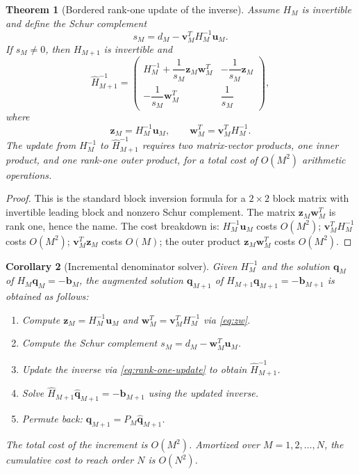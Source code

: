 \documentclass[11pt]{article}
\newtheorem{theorem}{Theorem}[section]
\newtheorem{corollary}[theorem]{Corollary}
\theoremstyle{definition}
\theoremstyle{remark}
\begin{document}
\begin{theorem}[Bordered rank-one update of the inverse]
\label{thm:rank-one}
Assume $H_{M}$ is invertible and define the Schur complement
\begin{equation}
s_{M}=d_{M}-\mathbf{v}_{M}^{T}H_{M}^{-1}\mathbf{u}_{M}.
\label{eq:schur}
\end{equation}
If $s_{M}\neq 0$, then $H_{M+1}$ is invertible and
\begin{equation}
\hat{H}_{M+1}^{-1}=
\begin{pmatrix}
H_{M}^{-1}+\dfrac{1}{s_{M}}\mathbf{z}_{M}\mathbf{w}_{M}^{T} & -\dfrac{1}{s_{M}}\mathbf{z}_{M}\\[8pt]
-\dfrac{1}{s_{M}}\mathbf{w}_{M}^{T} & \dfrac{1}{s_{M}}
\end{pmatrix},
\label{eq:rank-one-update}
\end{equation}
where
\begin{equation}
\mathbf{z}_{M}=H_{M}^{-1}\mathbf{u}_{M},\qquad
\mathbf{w}_{M}^{T}=\mathbf{v}_{M}^{T}H_{M}^{-1}.
\label{eq:zw}
\end{equation}
The update from $H_{M}^{-1}$ to $\hat{H}_{M+1}^{-1}$ requires two matrix-vector products, one inner product, and one rank-one outer product, for a total cost of $O(M^{2})$ arithmetic operations.
\end{theorem}

\begin{proof}
This is the standard block inversion formula for a $2\times 2$ block matrix with invertible leading block and nonzero Schur complement. The matrix $\mathbf{z}_{M}\mathbf{w}_{M}^{T}$ is rank one, hence the name. The cost breakdown is: $H_{M}^{-1}\mathbf{u}_{M}$ costs $O(M^{2})$; $\mathbf{v}_{M}^{T}H_{M}^{-1}$ costs $O(M^{2})$; $\mathbf{v}_{M}^{T}\mathbf{z}_{M}$ costs $O(M)$; the outer product $\mathbf{z}_{M}\mathbf{w}_{M}^{T}$ costs $O(M^{2})$.
\end{proof}

\begin{corollary}[Incremental denominator solver]
\label{cor:incremental-solver}
Given $H_{M}^{-1}$ and the solution $\mathbf{q}_{M}$ of $H_{M}\mathbf{q}_{M}=-\mathbf{b}_{M}$, the augmented solution $\mathbf{q}_{M+1}$ of $H_{M+1}\mathbf{q}_{M+1}=-\mathbf{b}_{M+1}$ is obtained as follows:
\begin{enumerate}[label=(\roman*)]
\item Compute $\mathbf{z}_{M}=H_{M}^{-1}\mathbf{u}_{M}$ and $\mathbf{w}_{M}^{T}=\mathbf{v}_{M}^{T}H_{M}^{-1}$ via \eqref{eq:zw}.
\item Compute the Schur complement $s_{M}=d_{M}-\mathbf{w}_{M}^{T}\mathbf{u}_{M}$.
\item Update the inverse via \eqref{eq:rank-one-update} to obtain $\hat{H}_{M+1}^{-1}$.
\item Solve $\hat{H}_{M+1}\hat{\mathbf{q}}_{M+1}=-\mathbf{b}_{M+1}$ using the updated inverse.
\item Permute back: $\mathbf{q}_{M+1}=P_{M}\hat{\mathbf{q}}_{M+1}$.
\end{enumerate}
The total cost of the increment is $O(M^{2})$. Amortized over $M=1,2,\ldots,N$, the cumulative cost to reach order $N$ is $O(N^{2})$.
\end{corollary}
\end{document}
